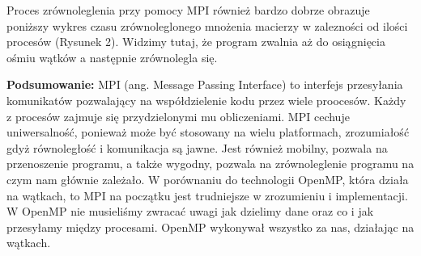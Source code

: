\documentclass[a4paper,12pt]{article}
\begin{document}
Proces zrównoleglenia przy pomocy MPI również bardzo dobrze obrazuje poniższy wykres czasu zrównoleglonego mnożenia macierzy w zalezności od ilości procesów (Rysunek 2). Widzimy tutaj, że program zwalnia aż do osiągnięcia ośmiu wątków a następnie zrównolegla się. 

\textbf{Podsumowanie:} MPI (ang. Message Passing Interface) to interfejs przesyłania komunikatów pozwalający na współdzielenie kodu przez wiele proocesów. Każdy z procesów zajmuje się przydzielonymi mu obliczeniami. MPI cechuje uniwersalność, ponieważ może być stosowany na wielu platformach, zrozumiałość gdyż równoległość i komunikacja są jawne. Jest również mobilny, pozwala na przenoszenie programu, a także wygodny, pozwala na zrównoleglenie programu na czym nam głównie zależało. W porównaniu do technologii OpenMP, która działa na wątkach, to MPI na początku jest trudniejsze w zrozumieniu i implementacji. W OpenMP nie musieliśmy zwracać uwagi jak dzielimy dane oraz co i jak przesyłamy między procesami. OpenMP wykonywał wszystko za nas, działając na wątkach. 
\end{document}
